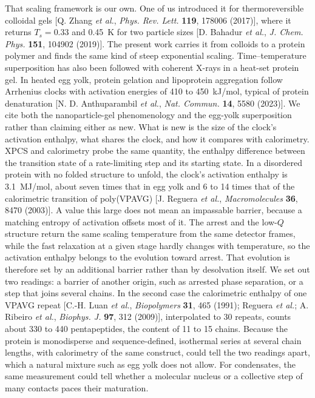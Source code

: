 \documentclass[10pt]{article}
\begin{document}
That scaling framework is our own. One of us introduced it for thermoreversible
colloidal gels [Q. Zhang \textit{et al.}, \textit{Phys. Rev. Lett.}
\textbf{119}, 178006 (2017)], where it returns $T_s=0.33$ and 0.45~K for two
particle sizes [D. Bahadur \textit{et al.}, \textit{J. Chem. Phys.}
\textbf{151}, 104902 (2019)]. The present work carries it from colloids to a
protein polymer and finds the same kind of steep exponential scaling. Time--temperature
superposition has also been followed with coherent X-rays in a heat-set protein
gel. In heated egg yolk, protein gelation and lipoprotein aggregation follow
Arrhenius clocks with activation energies of 410 to 450~kJ/mol, typical of
protein denaturation [N. D. Anthuparambil \textit{et al.}, \textit{Nat. Commun.}
\textbf{14}, 5580 (2023)]. We cite both the nanoparticle-gel phenomenology and
the egg-yolk superposition rather than claiming either as new. What is new is
the size of the clock's activation enthalpy, what shares the clock, and how it
compares with calorimetry. XPCS and calorimetry probe the same quantity, the
enthalpy difference between the transition state of a rate-limiting step and
its starting state. In a disordered protein with no folded structure to unfold,
the clock's activation enthalpy is 3.1~MJ/mol, about seven times that in egg
yolk and 6 to 14 times that of the calorimetric transition of poly(VPAVG)
[J. Reguera \textit{et al.}, \textit{Macromolecules} \textbf{36}, 8470 (2003)].
A value this large does not mean an impassable barrier, because a
matching entropy of activation offsets most of it. The arrest and the low-$Q$
structure return the same scaling temperature from the same detector frames,
while the fast relaxation at a given stage hardly changes with temperature, so
the activation enthalpy belongs to the evolution toward arrest. That evolution
is therefore set by an additional barrier rather than by desolvation itself. We
set out two readings: a barrier of another
origin, such as arrested phase separation, or a step that joins several chains.
In the second case the calorimetric enthalpy of one VPAVG repeat
[C.-H. Luan \textit{et al.}, \textit{Biopolymers} \textbf{31}, 465 (1991);
Reguera \textit{et al.}; A. Ribeiro \textit{et al.}, \textit{Biophys. J.}
\textbf{97}, 312 (2009)], interpolated to 30 repeats, counts about 330 to 440
pentapeptides, the content of 11 to 15 chains. Because the protein is
monodisperse and sequence-defined, isothermal series at several chain lengths,
with calorimetry of the same construct, could tell the two readings apart,
which a natural mixture such as egg yolk does not allow. For condensates, the
same measurement could tell whether a molecular nucleus or a collective step of
many contacts paces their maturation.
\end{document}
